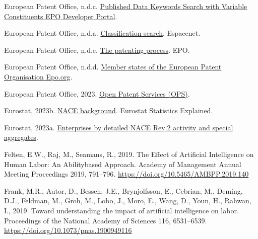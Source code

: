 \documentclass[
  12pt,
  a4paperpaper,
]{article}
\newlength{\cslhangindent}
\newenvironment{CSLReferences}[2] %
 {\begin{list}{}{%
  \setlength{\itemindent}{0pt}
  \setlength{\leftmargin}{0pt}
  \setlength{\parsep}{0pt}
  \ifodd #1
   \setlength{\leftmargin}{\cslhangindent}
   \setlength{\itemindent}{-1\cslhangindent}
  \fi
  \setlength{\itemsep}{#2\baselineskip}}}
 {\end{list}}
\begin{document}
\begin{CSLReferences}{1}{0}
European Patent Office, n.d.c.
\href{https://developers.epo.org/ops-v3-2/apis/get/published-data/search/\%7Bconstituent\%7D}{Published
{Data} {Keywords} {Search} with {Variable} {Constituents} {\textbar}
{EPO} {Developer} {Portal}}.

European Patent Office, n.d.a.
\href{https://worldwide.espacenet.com/patent/cpc-browser}{Classification
search}. Espacenet.

European Patent Office, n.d.e.
\href{https://www.epo.org/en/learning/learning-resources-profile/business-and-ip-managers/inventors-handbook/protecting-your-idea/patenting-process}{The
patenting process}. EPO.

European Patent Office, n.d.d.
\href{https://www.epo.org/en/about-us/foundation/member-states}{Member
states of the {European} {Patent} {Organisation} {\textbar} {Epo}.org}.

European Patent Office, 2023.
\href{https://developers.epo.org/ops-v3-2/apis}{Open {Patent} {Services}
({OPS})}.

Eurostat, 2023b.
\href{https://ec.europa.eu/eurostat/statistics-explained/index.php?title=NACE_background}{{NACE}
background}. Eurostat Statistics Explained.

Eurostat, 2023a.
\href{https://ec.europa.eu/eurostat/databrowser/view/sbs_ovw_act/default/table?lang=en}{Enterprises
by detailed {NACE} {Rev}.2 activity and special aggregates}.

Felten, E.W., Raj, M., Seamans, R., 2019. The {Effect} of {Artificial}
{Intelligence} on {Human} {Labor}: {An} {Abilitybased} {Approach}.
Academy of Management Annual Meeting Proceedings 2019, 791--796.
\url{https://doi.org/10.5465/AMBPP.2019.140}

Frank, M.R., Autor, D., Bessen, J.E., Brynjolfsson, E., Cebrian, M.,
Deming, D.J., Feldman, M., Groh, M., Lobo, J., Moro, E., Wang, D., Youn,
H., Rahwan, I., 2019. Toward understanding the impact of artificial
intelligence on labor. Proceedings of the National Academy of Sciences
116, 6531--6539. \url{https://doi.org/10.1073/pnas.1900949116}


\end{CSLReferences}
\end{document}
